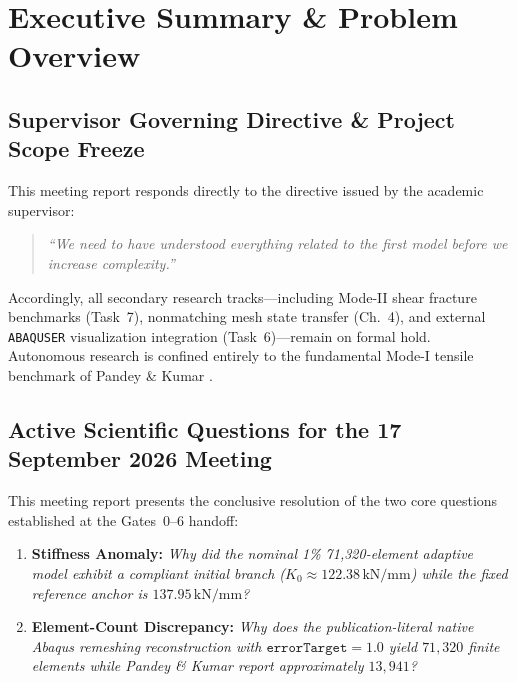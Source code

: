 \section{Executive Summary \& Problem Overview}
\label{sec:executive_summary}

\subsection{Supervisor Governing Directive \& Project Scope Freeze}
This meeting report responds directly to the directive issued by the academic supervisor:
\begin{quote}
\emph{``We need to have understood everything related to the first model before we increase complexity.''}
\end{quote}
Accordingly, all secondary research tracks---including Mode-II shear fracture benchmarks (Task~7), nonmatching mesh state transfer (Ch.~4), and external \texttt{ABAQUSER} visualization integration (Task~6)---remain on formal hold. Autonomous research is confined entirely to the fundamental Mode-I tensile benchmark of Pandey \& Kumar \citep{Pandey2025}.

\subsection{Active Scientific Questions for the 17 September 2026 Meeting}
This meeting report presents the conclusive resolution of the two core questions established at the Gates~0--6 handoff:
\begin{enumerate}[label=\textbf{Priority Question \Alph*:},leftmargin=36mm,itemsep=0pt,topsep=1pt]
  \item \textbf{Stiffness Anomaly:} \emph{Why did the nominal 1\% 71,320-element adaptive model exhibit a compliant initial branch ($K_0 \approx 122.38\,\mathrm{kN/mm}$) while the fixed reference anchor is $137.95\,\mathrm{kN/mm}$?}
  \item \textbf{Element-Count Discrepancy:} \emph{Why does the publication-literal native Abaqus remeshing reconstruction with $\texttt{errorTarget}=1.0$ yield $71{,}320$ finite elements while Pandey \& Kumar report approximately $13{,}941$?}
\end{enumerate}

